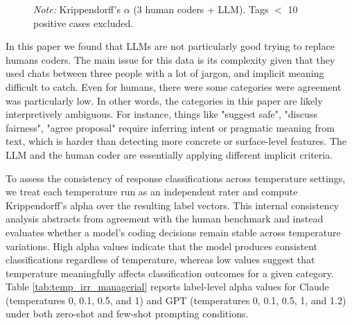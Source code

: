 \documentclass[11pt]{article}
\begin{document}
\begin{sloppypar}
\begin{figure}[htbp]
        \footnotesize
    \textit{Note:} Krippendorff’s $\alpha$ (3 human coders + LLM). Tags $<$ 10 positive cases excluded.
\end{figure}

%     

In this paper we found that LLMs are not particularly good trying to replace humans coders. The main issue for this data is its complexity given that they used chats between three people with a lot of jargon, and implicit meaning difficult to catch. Even for humans, there were some categories were agreement was particularly low. In other words, the categories in this paper are likely interpretively ambiguous. For instance, things like "suggest safe", "discuss fairness", "agree proposal" require inferring intent or pragmatic meaning from text, which is harder than detecting more concrete or surface-level features. The LLM and the human coder are essentially applying different implicit criteria.

To assess the consistency of response classifications across temperature settings, we treat each temperature run as an independent rater and compute Krippendorff’s alpha over the resulting label vectors. This internal consistency analysis abstracts from agreement with the human benchmark and instead evaluates whether a model’s coding decisions remain stable across temperature variations. High alpha values indicate that the model produces consistent classifications regardless of temperature, whereas low values suggest that temperature meaningfully affects classification outcomes for a given category. Table \ref{tab:temp_irr_managerial} reports label-level alpha values for Claude (temperatures 0, 0.1, 0.5, and 1) and GPT (temperatures 0, 0.1, 0.5, 1, and 1.2) under both zero-shot and few-shot prompting conditions.


\end{sloppypar}
\end{document}
